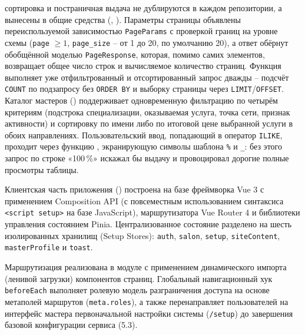 \begin{itemize}
        сортировка и постраничная выдача не дублируются в каждом
        репозитории, а вынесены в общие средства
        (,
        ). Параметры страницы объявлены
        переиспользуемой зависимостью \texttt{PageParams} с проверкой
        границ на уровне схемы (\texttt{page} $\ge 1$,
        \texttt{page\_size} -- от 1 до 20, по умолчанию 20), а ответ
        обёрнут обобщённой моделью \texttt{PageResponse}, которая, помимо
        самих элементов, возвращает общее число строк и вычисляемое
        количество страниц. Функция  выполняет уже
        отфильтрованный и отсортированный запрос дважды -- подсчёт
        \texttt{COUNT} по подзапросу без \texttt{ORDER BY} и выборку
        страницы через \texttt{LIMIT}/\texttt{OFFSET}. Каталог мастеров
        () поддерживает
        одновременную фильтрацию по четырём критериям (подстрока
        специализации, оказываемая услуга, точка сети, признак
        активности) и сортировку по имени либо по итоговой цене выбранной
        услуги в обоих направлениях. Пользовательский ввод, попадающий в
        оператор \texttt{ILIKE}, проходит через функцию
        , экранирующую символы шаблона
        \texttt{\%} и \texttt{\_}: без этого запрос по строке «100\,\%»
        искажал бы выдачу и провоцировал дорогие полные просмотры
        таблицы.
\end{itemize}


Клиентская часть приложения () построена на базе
фреймворка Vue 3 с применением Composition API (с повсеместным
использованием синтаксиса \texttt{<script setup>} на базе JavaScript),
маршрутизатора Vue Router 4 и библиотеки управления состоянием Pinia.
Централизованное состояние разделено на шесть изолированных хранилищ
(Setup Stores): \texttt{auth}, \texttt{salon}, \texttt{setup},
\texttt{siteContent}, \texttt{masterProfile} и \texttt{toast}.

Маршрутизация реализована в модуле  с применением
динамического импорта (ленивой загрузки) компонентов страниц. Глобальный
навигационный хук \texttt{beforeEach} выполняет ролевую модель
разграничения доступа на основе метаполей маршрутов (\texttt{meta.roles}),
а также перенаправляет пользователей на интерфейс мастера первоначальной
настройки системы (\texttt{/setup}) до завершения базовой конфигурации
сервиса (5.3).

